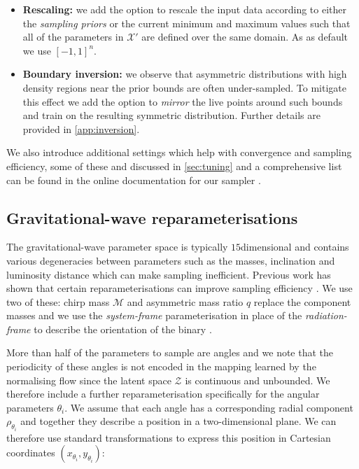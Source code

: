 \documentclass[%
 reprint,
nofootinbib,
 amsmath,amssymb,
 aps,
 prd,
]{revtex4-2}
\newcommand{\ndimensional}[1]{$#1$\nobreakdash\discretionary{-}{-}{-}dimensional}
\newcommand{\latent}{\mathcal{Z}}
\newcommand{\physical}{\mathcal{X}}
\begin{document}
\begin{itemize}
    \item {\textbf{Rescaling:} we add the option to rescale the input data according to either the \textit{sampling priors} or the current minimum and maximum values such that all of the parameters in $\physical'$ are defined over the same domain. As as default we use $[-1, 1]^{n}$.}
    \item {\textbf{Boundary inversion:} we observe that asymmetric distributions with high density regions near the prior bounds are often under-sampled. To mitigate this effect we add the option to \textit{mirror} the live points around such bounds and train on the resulting symmetric distribution. Further details are provided in \cref{app:inversion}.}
\end{itemize}

We also introduce additional settings which help with convergence and sampling efficiency, some of these and discussed in \cref{sec:tuning} and a comprehensive list can be found in the online documentation for our sampler \cite{nessai-docs}.

\subsection{Gravitational-wave reparameterisations}\label{sec:gw_reparam}

The gravitational-wave parameter space is typically \ndimensional{15} and contains various degeneracies between parameters such as the masses, inclination and luminosity distance which can make sampling inefficient. Previous work has shown that certain reparameterisations can improve sampling efficiency \cite{Veitch:2015}.  We use two of these: chirp mass $\mathcal{M}$ and asymmetric mass ratio $q$ replace the component masses and we use the \textit{system-frame} parameterisation in place of the \textit{radiation-frame} to describe the orientation of the binary \cite{Farr:2014system-frame}.

More than half of the parameters to sample are angles and we note that the periodicity of these angles is not encoded in the mapping learned by the normalising flow since the latent space $\latent$ is continuous and unbounded. We therefore include a further reparameterisation specifically for the angular parameters $\theta_i$. We assume that each angle has a corresponding radial component $\rho_{\theta_{i}}$ and together they describe a position in a two-dimensional plane. We can therefore use standard transformations to express this position in Cartesian coordinates $(x_{\theta_{i}}, y_{\theta_{i}})$:
\end{document}

